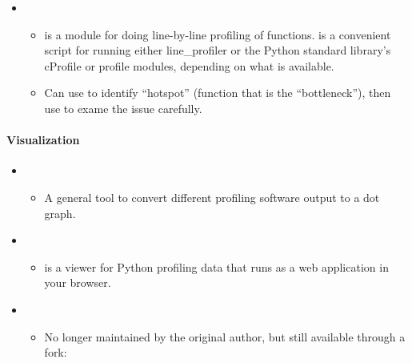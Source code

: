 \documentclass[letterpaper,10pt,english]{sphinxmanual}
\begin{document}
\begin{itemize}
\begin{itemize}
\end{itemize}

\item {} 
\begin{itemize}
\item {} 
 is a module for doing line-by-line profiling of
functions.  is a convenient script for running either
line\_profiler or the Python standard library’s cProfile or profile
modules, depending on what is available.

\item {} 
Can use  to identify “hotspot” (function that is the
“bottleneck”), then use  to exame the issue
carefully.

\end{itemize}

\end{itemize}


\paragraph{Visualization}
\label{\detokenize{resource/programing/python_write_your_project:visualization}}\begin{itemize}
\item {} 
\begin{itemize}
\item {} 
A general tool to convert different profiling software output to a
dot graph.

\end{itemize}

\item {} 
\begin{itemize}
\item {} 
 is a viewer for Python profiling data that runs as a
web application in your browser.

\end{itemize}

\item {} 
\begin{itemize}
\item {} 
No longer maintained by the original author, but still available
through a fork:

\end{itemize}

\end{itemize}
\end{document}
